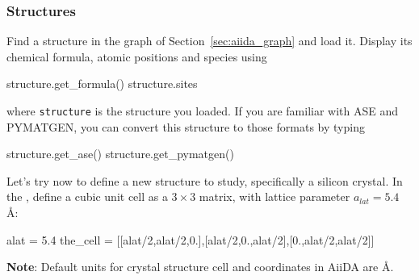 \subsubsection{Structures}

Find a structure in the graph of Section~\ref{sec:aiida_graph} and load it. Display
its chemical formula, atomic positions and species using
\begin{pythoncommand}
 structure.get_formula()
 structure.sites
\end{pythoncommand}
where \texttt{structure} is the structure you loaded. If you are familiar with ASE and PYMATGEN,
you can convert this structure to those formats by typing
\begin{pythoncommand}
 structure.get_ase()
 structure.get_pymatgen()
\end{pythoncommand}
Let's try now to define a new structure to study, specifically a silicon
crystal.
In the , define a cubic unit cell as a $3\times3$ matrix, with lattice parameter $a_{lat}=5.4$ \AA:
\begin{pythoncommand}
 alat = 5.4
 the_cell = [[alat/2,alat/2,0.],[alat/2,0.,alat/2],[0.,alat/2,alat/2]]
\end{pythoncommand}

{\bf Note}: Default units for crystal structure cell and coordinates in AiiDA are \AA.

